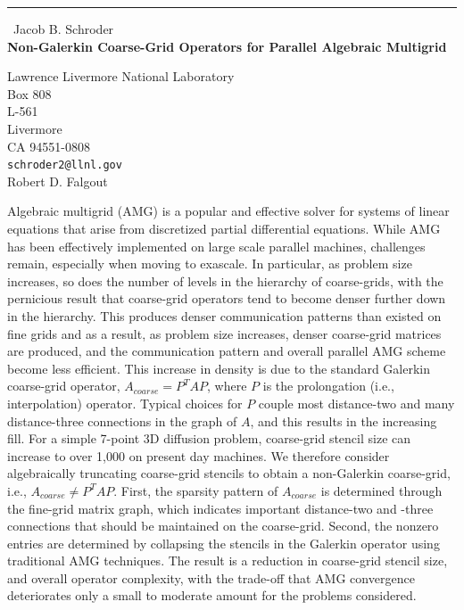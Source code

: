 \documentclass{report}
\begin{document}
\begin{center}
\rule{6in}{1pt} \
{\large Jacob B. Schroder \\
{\bf Non-Galerkin Coarse-Grid Operators for Parallel Algebraic Multigrid}}

Lawrence Livermore National Laboratory \\ Box 808 \\ L-561 \\ Livermore \\ CA 94551-0808
\\
{\tt schroder2@llnl.gov}\\
Robert D. Falgout\end{center}

Algebraic multigrid (AMG) is a popular and effective solver for systems of
linear equations that arise from discretized partial differential equations.
While AMG has been effectively implemented on large scale parallel machines,
challenges remain, especially when moving to exascale. In particular, as
problem size increases, so does the number of levels in the hierarchy of
coarse-grids, with the pernicious result that coarse-grid operators tend to
become denser further down in the hierarchy. This produces denser
communication patterns than existed on fine grids and as a result, as problem
size increases, denser coarse-grid matrices are produced, and the communication
pattern and overall parallel AMG scheme become less efficient. This increase
in density is due to the standard Galerkin coarse-grid operator, $A_{coarse} =
P^T A P$, where $P$ is the prolongation (i.e., interpolation) operator.
Typical choices for $P$ couple most distance-two and many distance-three
connections in the graph of $A$, and this results in the increasing fill. For
a simple 7-point 3D diffusion problem, coarse-grid stencil size can increase to
over 1,000 on present day machines. We therefore consider algebraically
truncating coarse-grid stencils to obtain a non-Galerkin coarse-grid, i.e.,
$A_{coarse} \neq P^T A P$. First, the sparsity pattern of $A_{coarse}$ is
determined through the fine-grid matrix graph, which indicates important
distance-two and -three connections that should be maintained on the
coarse-grid. Second, the nonzero entries are determined by collapsing the
stencils in the Galerkin operator using traditional AMG techniques. The result
is a reduction in coarse-grid stencil size, and overall operator complexity,
with the trade-off that AMG convergence deteriorates only a small to moderate
amount for the problems considered.
\end{document}
